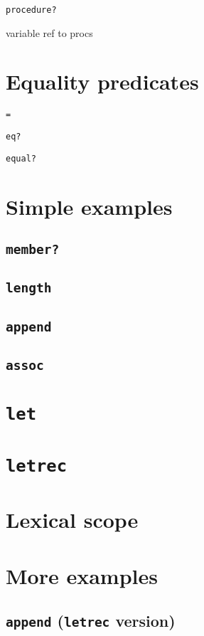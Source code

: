 \documentclass{book}
\begin{document}
\verb|procedure?|

variable ref to procs

\section{Equality predicates}

\verb|=|

\verb|eq?|

\verb|equal?|

\section{Simple examples}

\subsection{\texttt{member?}}

\subsection{\texttt{length}}

\subsection{\texttt{append}}

\subsection{\texttt{assoc}}

\section{\texttt{let}}

\section{\texttt{letrec}}

\section{Lexical scope}

\section{More examples}

\subsection{\texttt{append} (\texttt{letrec} version)}
\end{document}
